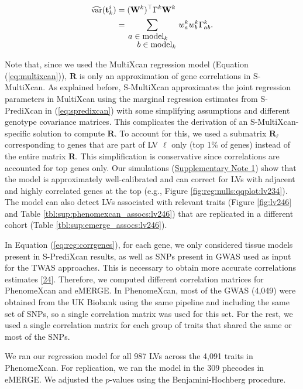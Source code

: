 \documentclass[
        11pt,
]{article}
\begin{document}
\begin{equation}
\begin{split}
\widehat{\mathrm{var}}(\mathbf{t}_k^i) & = (\mathbf{W}^k)^\top \Gamma^k \mathbf{W}^k \\
        & = \sum_{\splitfrac{a \in \mathrm{model}_k}{b \in \mathrm{model}_k}} w_a^k w_b^k \Gamma_{ab}^k.
\end{split}
\label{eq:reg:var_gene}\end{equation}

Note that, since we used the MultiXcan regression model (Equation (\ref{eq:multixcan})), \(\mathbf{R}\) is only an approximation of gene correlations in S-MultiXcan.
As explained before, S-MultiXcan approximates the joint regression parameters in MultiXcan using the marginal regression estimates from S-PrediXcan in (\ref{eq:spredixcan}) with some simplifying assumptions and different genotype covariance matrices.
This complicates the derivation of an S-MultiXcan-specific solution to compute \(\mathbf{R}\).
To account for this, we used a submatrix \(\mathbf{R}_{\ell}\) corresponding to genes that are part of LV \(\ell\) only (top 1\% of genes) instead of the entire matrix \(\mathbf{R}\).
This simplification is conservative since correlations are accounted for top genes only.
Our simulations (\protect\hyperlink{sm:reg:null_sim}{Supplementary Note 1}) show that the model is approximately well-calibrated and can correct for LVs with adjacent and highly correlated genes at the top (e.g., Figure \ref{fig:reg:nulls:qqplot:lv234}).
The model can also detect LVs associated with relevant traits (Figure \ref{fig:lv246} and Table \ref{tbl:sup:phenomexcan_assocs:lv246}) that are replicated in a different cohort (Table \ref{tbl:sup:emerge_assocs:lv246}).

In Equation (\ref{eq:reg:corrgenes}), for each gene, we only considered tissue models present in S-PrediXcan results, as well as SNPs present in GWAS used as input for the TWAS approaches.
This is necessary to obtain more accurate correlations estimates {[}\protect\hyperlink{ref-1FFzCXo1s}{24}{]}.
Therefore, we computed different correlation matrices for PhenomeXcan and eMERGE.
In PhenomeXcan, most of the GWAS (4,049) were obtained from the UK Biobank using the same pipeline and including the same set of SNPs, so a single correlation matrix was used for this set.
For the rest, we used a single correlation matrix for each group of traits that shared the same or most of the SNPs.

We ran our regression model for all 987 LVs across the 4,091 traits in PhenomeXcan.
For replication, we ran the model in the 309 phecodes in eMERGE.
We adjusted the \(p\)-values using the Benjamini-Hochberg procedure.
\end{document}
